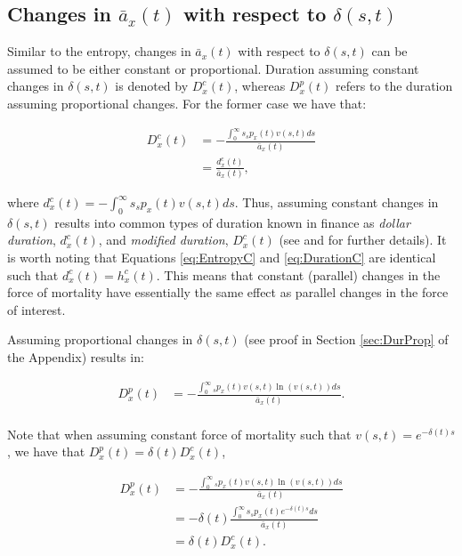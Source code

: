 \documentclass[12pt]{article}
\begin{document}
 
 

\subsection{Changes in $\bar{a}_x(t)$ with respect to $\delta(s,t)$}

 Similar to the entropy, changes in $\bar{a}_x(t)$ with respect to $\delta(s,t)$ can be assumed to be either constant or proportional. Duration assuming constant changes in $\delta(s,t)$ is denoted by ${D}^{c}_{x}(t)$, whereas ${D}^{p}_{x}(t)$ refers to the duration assuming proportional changes. For the former case we have that:



\begin{equation}\label{eq:DurationC}
\begin{split}
{D}^{c}_x(t)&= -\frac{\int_0^\infty s {}_sp_x(t) {v}(s,t)ds}{\bar{a}_x(t)} \\
&= \frac{{d}^{c}_x(t)}{\bar{a}_x(t)},
\end{split}
\end{equation}

where ${d}^{c}_x(t)=-\int_0^\infty s {}_sp_x(t) {v}(s,t)ds$. Thus, assuming constant changes in $\delta(s,t)$ results into common types of duration known in finance as \textit{dollar duration}, ${d}^{c}_x(t)$, and \textit{modified duration}, ${D}^{c}_x(t)$ (see \citet{Milevsky2012} and \citet{Tsai2013a} for further details). It is worth noting that Equations \ref{eq:EntropyC} and \ref{eq:DurationC} are identical such that ${d}^{c}_x(t)={h}^{c}_{x}(t)$. This means that constant (parallel) changes in the force of mortality have essentially the same effect as parallel changes in the force of interest.


Assuming proportional changes in $\delta(s,t)$ (see proof in Section \ref{sec:DurProp} of the Appendix) results in: 


\begin{equation}\label{eq:DurationP}
\begin{split}
{D}^{p}_{x}(t) &= -\frac{\int_0^\infty {}_sp_x(t) v(s,t) \ln(v(s,t))ds}{\bar{a}_x(t)}. \\
\end{split}
\end{equation}


Note that when assuming constant force of mortality such that $v(s,t)=e^{-\delta(t)s}$, we have that ${D}^{p}_{x}(t)=\delta(t){D}^{c}_{x}(t)$,


\begin{equation}\label{eq:DurationCP}
\begin{split}
{D}^{p}_{x}(t) &= -\frac{\int_0^\infty {}_sp_x(t) v(s,t) \ln(v(s,t))ds}  {\bar{a}_x(t)} \\
&=- \delta(t)\frac{\int_0^\infty s{}_sp_x(t) e^{-\delta(t)s}  ds}{\bar{a}_x(t)} \\
& = \delta(t){D}^{c}_{x}(t).
\end{split}
\end{equation}
\end{document}
